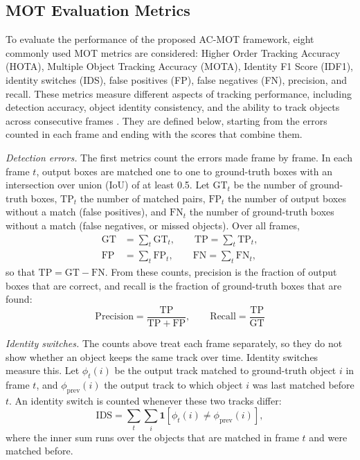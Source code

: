\documentclass[journal]{new-aiaa}
\begin{document}
\subsection{MOT Evaluation Metrics}\label{sec:metrics}
To evaluate the performance of the proposed AC-MOT framework, eight commonly
used MOT metrics are considered: Higher Order Tracking
Accuracy (HOTA), Multiple Object Tracking Accuracy (MOTA), Identity F1 Score
(IDF1), identity switches (IDS), false positives (FP), false negatives (FN),
precision, and recall. These metrics measure different aspects of tracking
performance, including detection accuracy, object identity consistency, and
the ability to track objects across consecutive frames
\cite{dendorfer2021motchallenge,luiten2021hota}. They are defined below,
starting from the errors counted in each frame and ending with the scores that
combine them.

\emph{Detection errors.} The first metrics count the errors made frame by
frame. In each frame $t$, output boxes are matched one to one to ground-truth boxes with an intersection over union (IoU) of at least 0.5. Let $\mathrm{GT}_t$ be
the number of ground-truth boxes, $\mathrm{TP}_t$ the number of matched pairs,
$\mathrm{FP}_t$ the number of output boxes without a match (false positives),
and $\mathrm{FN}_t$ the number of ground-truth boxes without a match (false
negatives, or missed objects). Over all frames,
\begin{align}
\mathrm{GT}&=\sum_t \mathrm{GT}_t,\qquad \mathrm{TP}=\sum_t \mathrm{TP}_t,\label{eq:gt}\\
\mathrm{FP}&=\sum_t \mathrm{FP}_t,\qquad \mathrm{FN}=\sum_t \mathrm{FN}_t,\label{eq:fpfn}
\end{align}
so that $\mathrm{TP}=\mathrm{GT}-\mathrm{FN}$. From these counts, precision
is the fraction of output boxes that are correct, and recall is the fraction of ground-truth
boxes that are found:
\begin{equation}
\mathrm{Precision}=\frac{\mathrm{TP}}{\mathrm{TP}+\mathrm{FP}},\qquad
\mathrm{Recall}=\frac{\mathrm{TP}}{\mathrm{GT}}
\label{eq:prrc}
\end{equation}

\emph{Identity switches.} The counts above treat each frame separately, so
they do not show whether an object keeps the same track over time. Identity
switches measure this. Let $\phi_t(i)$ be the output track matched to
ground-truth object $i$ in frame $t$, and $\phi_{\mathrm{prev}}(i)$ the
output track to which object $i$ was last matched before $t$. An identity
switch is counted whenever these two tracks differ:
\begin{equation}
\mathrm{IDS}=\sum_t\sum_{i}\mathbf{1}\!\left[\phi_t(i)\neq\phi_{\mathrm{prev}}(i)\right],
\label{eq:ids}
\end{equation}
where the inner sum runs over the objects that are matched in frame $t$ and
were matched before.
\end{document}

